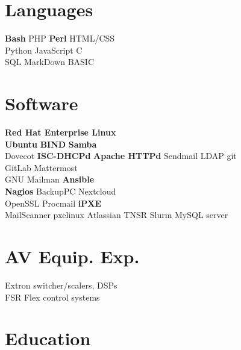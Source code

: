 \documentclass[letterpaper]{deedy-resume-openfont}
\begin{document}



\begin{minipage}[t]{0.27\textwidth}
\section{Languages}
\textbf{Bash} \textbullet{} PHP \textbullet{} \textbf{Perl} \textbullet{} HTML/CSS \\
Python \textbullet{} JavaScript \textbullet{} C \\
SQL \textbullet{} MarkDown \textbullet{} BASIC

\section{Software}
\textbf{Red Hat Enterprise Linux} \\
\textbf{Ubuntu} \textbullet{} \textbf{BIND} \textbullet{} \textbf{Samba} \\
Dovecot \textbullet{} 
\textbf{ISC-DHCPd} \textbullet{} \textbf{Apache HTTPd} \textbullet{}
Sendmail \textbullet{} LDAP \textbullet{} git \\
GitLab \textbullet{}  Mattermost \\
GNU Mailman \textbullet{} \textbf{Ansible} \\
\textbf{Nagios} \textbullet{} BackupPC \textbullet{}
Nextcloud \\
OpenSSL \textbullet{} Procmail \textbullet{} \textbf{iPXE} \\
MailScanner \textbullet{}
pxelinux \textbullet{} Atlassian \textbullet{} TNSR \textbullet
Slurm \textbullet{}
MySQL server


\section{AV Equip. Exp.}
Extron switcher/scalers, DSPs \\
FSR Flex control systems


\section{Education}

\end{minipage}
\end{document}
